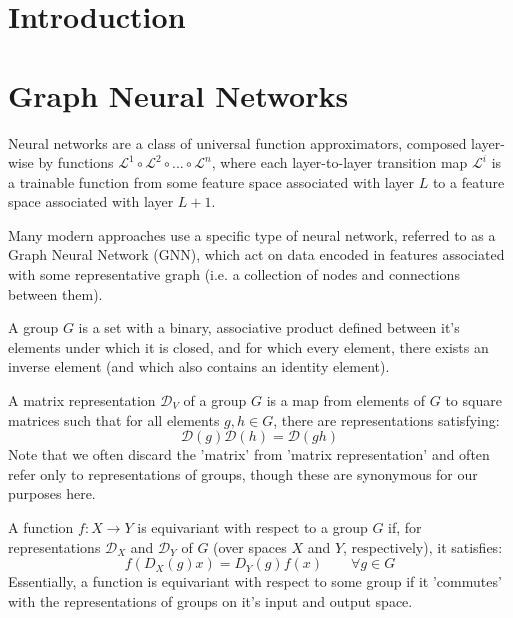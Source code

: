 \documentclass[10pt,a4paper]{article}
\begin{document}
\section{Introduction}



\section{Graph Neural Networks}
Neural networks are a class of universal function approximators, composed layer-wise by functions $\mathcal{L}^1\circ\mathcal{L}^2\circ ... \circ \mathcal{L}^n $, where each layer-to-layer transition map $\mathcal{L}^i$ is a trainable function from some feature space associated with layer $L$ to a feature space associated with layer $L+1$.

Many modern approaches use a specific type of neural network, referred to as a Graph Neural Network (GNN), which act on data encoded in features associated with some representative graph (i.e. a collection of nodes and connections between them).


A group $G$ is a set with a binary, associative product defined between it's elements under which it is closed, and for which every element, there exists an inverse element (and which also contains an identity element).



A matrix representation $\mathcal{D}_{V}$ of a group $G$ is a map from elements of $G$ to square matrices such that for all elements $g,h\in G$, there are representations satisfying:
$$
\mathcal{D}(g)\mathcal{D}(h)=\mathcal{D}(gh)
$$
Note that we often discard the 'matrix' from 'matrix representation' and often refer only to representations of groups, though these are synonymous for our purposes here.


A function $f:X\rightarrow Y$ is equivariant with respect to a group $G$ if, for representations $\mathcal{D}_X$ and $\mathcal{D}_Y$ of $G$ (over spaces $X$ and $Y$, respectively), it satisfies:
$$
f(D_X(g)x) = D_Y(g)f(x) \quad\quad \forall g\in G
$$
Essentially, a function is equivariant with respect to some group if it 'commutes' with the representations of groups on it's input and output space. 
\end{document}
